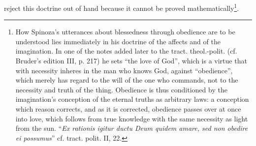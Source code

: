 \documentclass[12pt,a4paper,openany]{book}
\newcommand{\opage}[1]{\marginnote{\footnotesize\textit{[#1]}}}
\begin{document}
\opage{159}\setcounter{footnote}{0}reject this doctrine out of hand because it cannot be proved mathematically\footnote{How Spinoza's utterances about blessedness through obedience are to be understood lies immediately in his doctrine of the affects and of the imagination. In one of the notes added later to the tract. theol.-polit. (cf. Bruder's edition III, p. 217) he sets ``the love of God'', which is a virtue that with necessity inheres in the man who knows God, against ``obedience'', which merely has regard to the will of the one who commands, not to the necessity and truth of the thing. Obedience is thus conditioned by the imagination's conception of the eternal truths as arbitrary laws: a conception which reason corrects, and as it is corrected, obedience passes over at once into love, which follows from true knowledge with the same necessity as light from the sun. ``\emph{Ex rationis igitur ductu Deum quidem amare, sed non obedire ei possumus}'' cf. tract. polit. II, 22.}.
\end{document}
